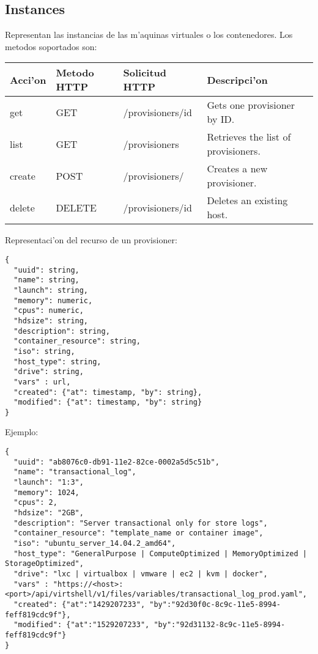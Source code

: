 \subsection{Instances}
Representan las instancias de las m'aquinas virtuales o los contenedores. Los metodos soportados son:

\begin{center}
 \begin{tabular}{| l | l | l | l |}
 \hline
  \rowcolor{blueapi}
  \textbf{Acci'on} & \textbf{Metodo HTTP} & \textbf{Solicitud HTTP} & \textbf{Descripci'on} \\ [0.5ex] 
  \hline\hline
  get & GET & /provisioners/id & Gets one provisioner by ID. \\
  \hline
  list & GET & /provisioners & Retrieves the list of provisioners. \\
  \hline  
  create & POST & /provisioners/ & Creates a new provisioner. \\
  \hline
  delete & DELETE & /provisioners/id & Deletes an existing host. \\ [1ex] 
  \hline
\end{tabular}
\end{center}

Representaci'on del recurso de un provisioner:

\medskip
\begin{lstlisting}[style=json]
{
  "uuid": string,
  "name": string,
  "launch": string,
  "memory": numeric,
  "cpus": numeric,
  "hdsize": string,
  "description": string, 
  "container_resource": string,
  "iso": string,
  "host_type": string,
  "drive": string,
  "vars" : url,
  "created": {"at": timestamp, "by": string},
  "modified": {"at": timestamp, "by": string}
}
\end{lstlisting}

Ejemplo:

\medskip
\begin{lstlisting}[style=json]
{
  "uuid": "ab8076c0-db91-11e2-82ce-0002a5d5c51b",
  "name": "transactional_log",
  "launch": "1:3",
  "memory": 1024,
  "cpus": 2,
  "hdsize": "2GB",
  "description": "Server transactional only for store logs", 
  "container_resource": "template_name or container image",
  "iso": "ubuntu_server_14.04.2_amd64",
  "host_type": "GeneralPurpose | ComputeOptimized | MemoryOptimized | StorageOptimized",
  "drive": "lxc | virtualbox | vmware | ec2 | kvm | docker",
  "vars" : "https://<host>:<port>/api/virtshell/v1/files/variables/transactional_log_prod.yaml",
  "created": {"at":"1429207233", "by":"92d30f0c-8c9c-11e5-8994-feff819cdc9f"},
  "modified": {"at":"1529207233", "by":"92d31132-8c9c-11e5-8994-feff819cdc9f"}
}
\end{lstlisting}


